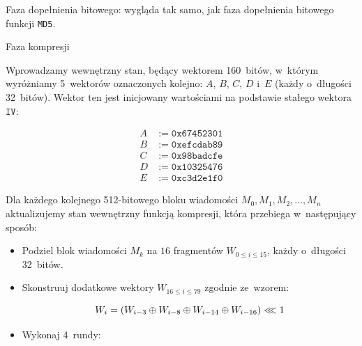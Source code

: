 \begin{myenumerate}

    \item Faza dopełnienia bitowego: wygląda tak samo, jak faza dopełnienia
    bitowego funkcji \texttt{MD5}.

    \item Faza kompresji

    \begin{myenumerate}

        \item Wprowadzamy wewnętrzny stan, będący wektorem 160~bitów, w~którym
        wyróżniamy 5~wektorów oznaczonych kolejno: $A$, $B$, $C$, $D$ i~$E$
        (każdy o~długości 32~bitów). Wektor ten jest inicjowany wartościami na
        podstawie stałego wektora $\mathtt{IV}$:

        \[
            \begin{aligned}
                A &:= \mathtt{0x67452301} \\
                B &:= \mathtt{0xefcdab89} \\
                C &:= \mathtt{0x98badcfe} \\
                D &:= \mathtt{0x10325476} \\
                E &:= \mathtt{0xc3d2e1f0}
            \end{aligned}
        \]

        \item Dla każdego kolejnego 512-bitowego bloku wiadomości \break $M_0,
        M_1, M_2, \ldots, M_n$ aktualizujemy stan wewnętrzny funkcją kompresji,
        która przebiega w~następujący sposób:

        \begin{itemize}

            \item Podziel blok wiadomości $M_k$ na $16$ fragmentów $W_{0 \leq i
            \leq 15}$, każdy o~długości 32~bitów.

            \item Skonstruuj dodatkowe wektory $W_{16 \leq i \leq 79}$ zgodnie
            ze~wzorem:

            $$
                W_i = (W_{i-3} \oplus W_{i-8} \oplus W_{i-14} \oplus W_{i-16})
                \llless 1
            $$

            \item Wykonaj 4~rundy:

            \begin{itemize}


\end{itemize}
\end{itemize}
\end{myenumerate}
\end{myenumerate}
